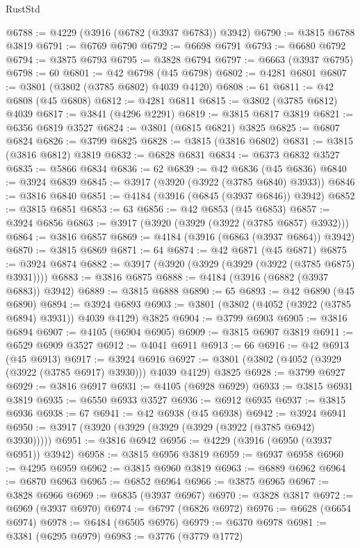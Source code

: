\begin{lexlean}{RustStd}
\begin{coremodule}
@6788 := @4229 (@3916 (@6782 (@3937 @6783)) @3942)
@6790 := @3815 @6788 @3819
@6791 := @6769 @6790
@6792 := @6698 @6791
@6793 := @6680 @6792
@6794 := @3875 @6793
@6795 := @3828 @6794
@6797 := @6663 (@3937 @6795)
@6798 := 60
@6801 := @42 @6798 (@45 @6798)
@6802 := @4281 @6801
@6807 := @3801 (@3802 (@3785 @6802) @4039 @4120)
@6808 := 61
@6811 := @42 @6808 (@45 @6808)
@6812 := @4281 @6811
@6815 := @3802 (@3785 @6812) @4039
@6817 := @3841 (@4296 @2291)
@6819 := @3815 @6817 @3819
@6821 := @6356 @6819 @3527
@6824 := @3801 (@6815 @6821) @3825
@6825 := @6807 @6824
@6826 := @3799 @6825
@6828 := @3815 (@3816 @6802)
@6831 := @3815 (@3816 @6812) @3819
@6832 := @6828 @6831
@6834 := @6373 @6832 @3527
@6835 := @5866 @6834
@6836 := 62
@6839 := @42 @6836 (@45 @6836)
@6840 := @3924 @6839
@6845 := @3917 (@3920 (@3922 (@3785 @6840) @3933))
@6846 := @3816 @6840
@6851 := @4184 (@3916 (@6845 (@3937 @6846)) @3942)
@6852 := @3815 @6851
@6853 := 63
@6856 := @42 @6853 (@45 @6853)
@6857 := @3924 @6856
@6863 := @3917 (@3920 (@3929 (@3922 (@3785 @6857) @3932)))
@6864 := @3816 @6857
@6869 := @4184 (@3916 (@6863 (@3937 @6864)) @3942)
@6870 := @3815 @6869
@6871 := 64
@6874 := @42 @6871 (@45 @6871)
@6875 := @3924 @6874
@6882 := @3917 (@3920 (@3929 (@3929 (@3922 (@3785 @6875) @3931))))
@6883 := @3816 @6875
@6888 := @4184 (@3916 (@6882 (@3937 @6883)) @3942)
@6889 := @3815 @6888
@6890 := 65
@6893 := @42 @6890 (@45 @6890)
@6894 := @3924 @6893
@6903 := @3801 (@3802 (@4052 (@3922 (@3785 @6894) @3931)) @4039 @4129) @3825
@6904 := @3799 @6903
@6905 := @3816 @6894
@6907 := @4105 (@6904 @6905)
@6909 := @3815 @6907 @3819
@6911 := @6529 @6909 @3527
@6912 := @4041 @6911
@6913 := 66
@6916 := @42 @6913 (@45 @6913)
@6917 := @3924 @6916
@6927 := @3801 (@3802 (@4052 (@3929 (@3922 (@3785 @6917) @3930))) @4039 @4129) @3825
@6928 := @3799 @6927
@6929 := @3816 @6917
@6931 := @4105 (@6928 @6929)
@6933 := @3815 @6931 @3819
@6935 := @6550 @6933 @3527
@6936 := @6912 @6935
@6937 := @3815 @6936
@6938 := 67
@6941 := @42 @6938 (@45 @6938)
@6942 := @3924 @6941
@6950 := @3917 (@3920 (@3929 (@3929 (@3929 (@3922 (@3785 @6942) @3930)))))
@6951 := @3816 @6942
@6956 := @4229 (@3916 (@6950 (@3937 @6951)) @3942)
@6958 := @3815 @6956 @3819
@6959 := @6937 @6958
@6960 := @4295 @6959
@6962 := @3815 @6960 @3819
@6963 := @6889 @6962
@6964 := @6870 @6963
@6965 := @6852 @6964
@6966 := @3875 @6965
@6967 := @3828 @6966
@6969 := @6835 (@3937 @6967)
@6970 := @3828 @3817
@6972 := @6969 (@3937 @6970)
@6974 := @6797 (@6826 @6972)
@6976 := @6628 (@6654 @6974)
@6978 := @6484 (@6505 @6976)
@6979 := @6370 @6978
@6981 := @3381 (@6295 @6979)
@6983 := @3776 (@3779 @1772)

\end{coremodule}
\end{lexlean}
